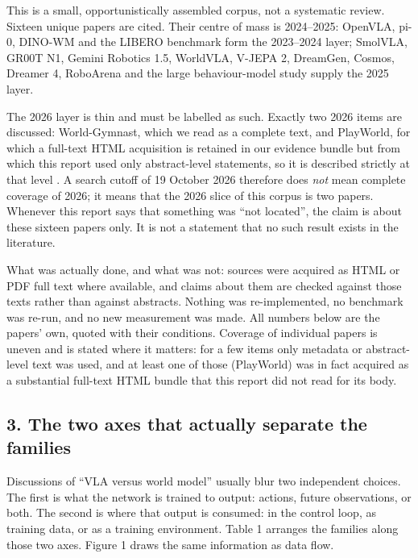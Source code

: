 \documentclass[
  10pt,
  english,
]{article}
\begin{document}
This is a small, opportunistically assembled corpus, not a systematic
review. Sixteen unique papers are cited. Their centre of mass is
2024--2025: OpenVLA, pi-0, DINO-WM \citep{openvla, pi0, dino_wm} and the
LIBERO benchmark \citep{libero} form the 2023--2024 layer; SmolVLA,
GR00T N1, Gemini Robotics 1.5, WorldVLA, V-JEPA 2, DreamGen, Cosmos,
Dreamer 4, RoboArena and the large behaviour-model study
\citep{smolvla, groot_n1, gemini_robotics15, worldvla, vjepa2, dreamgen, cosmos, dreamer4, roboarena, lbm}
supply the 2025 layer.

The 2026 layer is thin and must be labelled as such. Exactly two 2026
items are discussed: World-Gymnast, which we read as a complete text,
and PlayWorld, for which a full-text HTML acquisition is retained in our
evidence bundle but from which this report used only abstract-level
statements, so it is described strictly at that level
\citep{world_gymnast, playworld}. A search cutoff of 19 October 2026
therefore does \emph{not} mean complete coverage of 2026; it means that
the 2026 slice of this corpus is two papers. Whenever this report says
that something was ``not located'', the claim is about these sixteen
papers only. It is not a statement that no such result exists in the
literature.

What was actually done, and what was not: sources were acquired as HTML
or PDF full text where available, and claims about them are checked
against those texts rather than against abstracts. Nothing was
re-implemented, no benchmark was re-run, and no new measurement was
made. All numbers below are the papers' own, quoted with their
conditions. Coverage of individual papers is uneven and is stated where
it matters: for a few items only metadata or abstract-level text was
used, and at least one of those (PlayWorld) was in fact acquired as a
substantial full-text HTML bundle that this report did not read for its
body.

\hypertarget{the-two-axes-that-actually-separate-the-families}{%
\subsection{3. The two axes that actually separate the
families}\label{the-two-axes-that-actually-separate-the-families}}

Discussions of ``VLA versus world model'' usually blur two independent
choices. The first is what the network is trained to output: actions,
future observations, or both. The second is where that output is
consumed: in the control loop, as training data, or as a training
environment. Table 1 arranges the families along those two axes. Figure
1 draws the same information as data flow.
\end{document}
